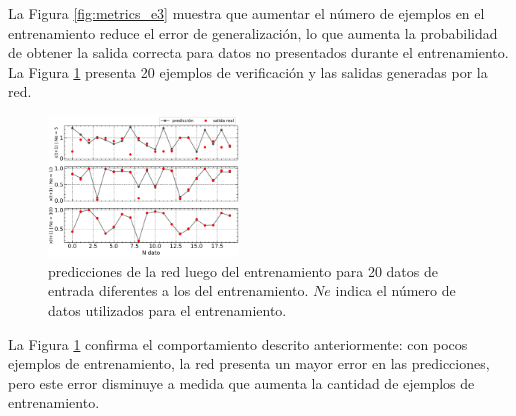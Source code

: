 \documentclass[11pt, twocolumn]{article}
\begin{document}
La Figura \ref{fig:metrics_e3} muestra que aumentar el número de ejemplos en el entrenamiento reduce el error de generalización, lo que aumenta la probabilidad de obtener la salida correcta para datos no presentados durante el entrenamiento. La Figura \ref{fig:predicciones_e3} presenta 20 ejemplos de verificación y las salidas generadas por la red.

\begin{figure}
  \centering
  \includegraphics[width=0.45\textwidth]{figures/predicciones_e3.pdf}
  \caption{predicciones de la red luego del entrenamiento para 20 datos de entrada diferentes a los del entrenamiento. \(Ne\) indica el número de datos utilizados para el entrenamiento.}
  \label{fig:predicciones_e3}
\end{figure}

La Figura \ref{fig:predicciones_e3} confirma el comportamiento descrito anteriormente: con pocos ejemplos de entrenamiento, la red presenta un mayor error en las predicciones, pero este error disminuye a medida que aumenta la cantidad de ejemplos de entrenamiento.
\end{document}
